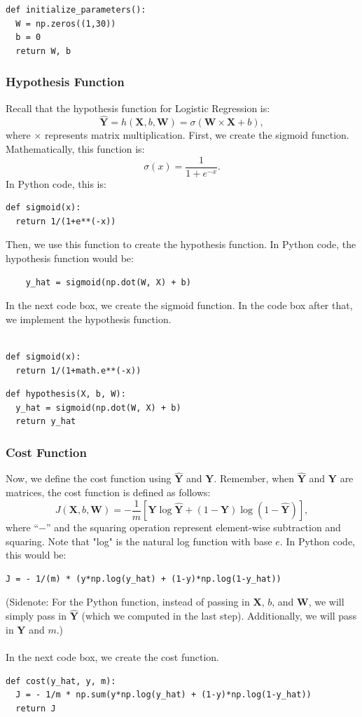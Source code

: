 \documentclass{article}
\begin{document}
\begin{lstlisting}
def initialize_parameters():
  W = np.zeros((1,30))
  b = 0
  return W, b
\end{lstlisting}

\subsubsection{Hypothesis Function}
Recall that the hypothesis function for Logistic Regression is:
$$\hat{\textbf{Y}}=h(\textbf{X},b,\textbf{W})=\sigma(\textbf{W}\times \textbf{X} + b),$$
where $\times$ represents matrix multiplication. First, we create the sigmoid function. Mathematically, this function is:
$$\sigma(x) = \frac{1}{1+e^{-x}}.$$
In Python code, this is:
\begin{lstlisting}
def sigmoid(x):
  return 1/(1+e**(-x))
\end{lstlisting}
Then, we use this function to create the hypothesis function. In Python code, the hypothesis function would be:
\begin{lstlisting}
    y_hat = sigmoid(np.dot(W, X) + b)
\end{lstlisting}
In the next code box, we create the sigmoid function. In the code box after that, we implement the hypothesis function.
\\
\\
\begin{lstlisting}
def sigmoid(x):
  return 1/(1+math.e**(-x))
\end{lstlisting}

\begin{lstlisting}
def hypothesis(X, b, W):
  y_hat = sigmoid(np.dot(W, X) + b)
  return y_hat
\end{lstlisting}

\subsubsection{Cost Function}
Now, we define the cost function using $\hat{\textbf{Y}}$ and $\textbf{Y}$. Remember, when $\hat{\textbf{Y}}$ and $\textbf{Y}$ are matrices, the cost function is defined as follows:
$$J(\textbf{X},b,\textbf{W})=-\frac{1}{m}\left[\textbf{Y}\log{\hat{\textbf{Y}}}+(1-\textbf{Y})\log{(1-\hat{\textbf{Y}})}\right],$$
where ``$-$'' and the squaring operation represent element-wise subtraction and squaring. Note that "log" is the natural log function with base $e$. In Python code, this would be:
\begin{lstlisting}
J = - 1/(m) * (y*np.log(y_hat) + (1-y)*np.log(1-y_hat))
\end{lstlisting}
(Sidenote: For the Python function, instead of passing in $\textbf{X}$, $b$, and $\textbf{W}$, we will simply pass in $\hat{\textbf{Y}}$ (which we computed in the last step). Additionally, we will pass in $\textbf{Y}$ and $m$.) 
\\
\\
In the next code box, we create the cost function.
\begin{lstlisting}
def cost(y_hat, y, m):
  J = - 1/m * np.sum(y*np.log(y_hat) + (1-y)*np.log(1-y_hat))
  return J
\end{lstlisting}
\end{document}
